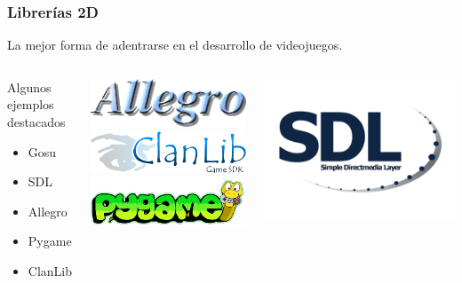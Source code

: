 \begin{frame}
	\frametitle{Librerías 2D}
	La mejor forma de adentrarse en el desarrollo de videojuegos.
	\newline
	\begin{columns}[c]
		\column{100pt}
		\begin{block}{Algunos ejemplos destacados}
            \begin{itemize}
							\item Gosu
							\item SDL
							\item Allegro
							\item Pygame
							\item ClanLib
            \end{itemize}            
        \end{block}        
		\column{100pt}
		\begin{center}
			\includegraphics[scale=0.32]{img/allegro.png}
			\newline
			\newline
			\includegraphics[scale=0.22]{img/clanlib.png}
			\newline
			\newline
			\includegraphics[scale=0.22]{img/pygame.png}
		\end{center}
		\column{100pt}
		\begin{center}
			\includegraphics[scale=0.045]{img/sdl.png}

\end{center}
\end{columns}
\end{frame}
